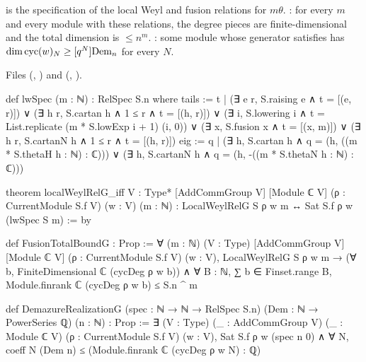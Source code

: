 \begin{definition}\label{l26:def:lwspec}
 is the specification of the local Weyl and fusion relations for $m\theta$. \textbf{}:
for every $m$ and every module with these relations, the degree pieces are finite-dimensional and the total dimension is
$\le n^m$. \textbf{}: some module whose generator satisfies  has
$\dim\operatorname{cyc}(w)_N\ge[q^N]\mathrm{Dem}_n$ for every $N$.
\end{definition}
\noindent Files  (,
) and 
(, ).
\begin{leancode}
def lwSpec (m : ℕ) : RelSpec S.n where
  tails := {t | (∃ e r, S.raising e ∧ t = [(e, r)]) ∨ (∃ h r, S.cartan h ∧ 1 ≤ r ∧ t = [(h, r)]) ∨
    (∃ i, S.lowering i ∧ t = List.replicate (m * S.lowExp i + 1) (i, 0)) ∨
    (∃ x, S.fusion x ∧ t = [(x, m)]) ∨ (∃ h r, S.cartanN h ∧ 1 ≤ r ∧ t = [(h, r)])}
  eig := {q | (∃ h, S.cartan h ∧ q = (h, ((m * S.thetaH h : ℕ) : ℂ))) ∨
    (∃ h, S.cartanN h ∧ q = (h, -((m * S.thetaN h : ℕ) : ℂ)))}

theorem localWeylRelG_iff {V : Type*} [AddCommGroup V] [Module ℂ V] (ρ : CurrentModule S.f V)
    (w : V) (m : ℕ) : LocalWeylRelG S ρ w m ↔ Sat S.f ρ w (lwSpec S m) := by

def FusionTotalBoundG : Prop :=
  ∀ (m : ℕ) (V : Type) [AddCommGroup V] [Module ℂ V] (ρ : CurrentModule S.f V) (w : V),
    LocalWeylRelG S ρ w m → (∀ b, FiniteDimensional ℂ (cycDeg ρ w b)) ∧
      ∀ B : ℕ, ∑ b ∈ Finset.range B, Module.finrank ℂ (cycDeg ρ w b) ≤ S.n ^ m

def DemazureRealizationG (spec : ℕ → ℕ → RelSpec S.n) (Dem : ℕ → PowerSeries ℚ) (n : ℕ) : Prop :=
  ∃ (V : Type) (_ : AddCommGroup V) (_ : Module ℂ V) (ρ : CurrentModule S.f V) (w : V),
    Sat S.f ρ w (spec n 0) ∧ ∀ N, coeff N (Dem n) ≤ (Module.finrank ℂ (cycDeg ρ w N) : ℚ)
\end{leancode}

